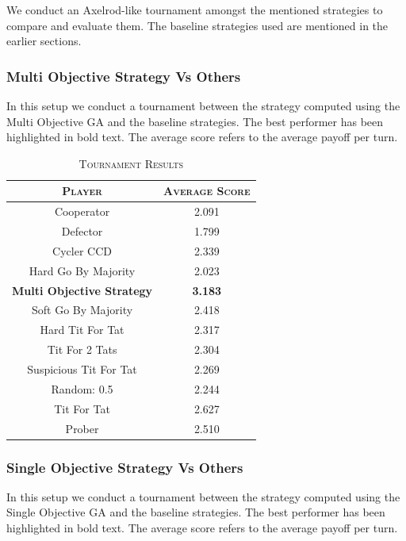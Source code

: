 \documentclass[a4paper]{article}
\begin{document}
	We conduct an Axelrod-like tournament amongst the mentioned strategies to compare and evaluate them. The baseline strategies used are mentioned in the earlier sections.

	\subsubsection{Multi Objective Strategy Vs Others}

	In this setup we conduct a tournament between the strategy computed using the Multi Objective GA and the baseline strategies. The best performer has been highlighted in bold text. The average score refers to the average payoff per turn.

	\begin{table}[H]
	  \begin{center}
	    \begin{tabular}{c|c}
	      \toprule
	      \textsc{Player} & \textsc{Average Score}\\
	      \midrule
			Cooperator & 2.091\\
			Defector & 1.799\\
			Cycler CCD & 2.339\\
			Hard Go By Majority & 2.023\\
			\textbf{Multi Objective Strategy} & \textbf{3.183}\\
			Soft Go By Majority & 2.418\\
			Hard Tit For Tat & 2.317\\
			Tit For 2 Tats & 2.304\\
			Suspicious Tit For Tat & 2.269\\
			Random: 0.5 & 2.244\\
			Tit For Tat & 2.627\\
			Prober & 2.510\\
		  \bottomrule
	    \end{tabular}
	    \caption{\textsc{Tournament Results}}
	  \end{center}
	\end{table}  

	\subsubsection{Single Objective Strategy Vs Others}

In this setup we conduct a tournament between the strategy computed using the Single Objective GA and the baseline strategies. The best performer has been highlighted in bold text. The average score refers to the average payoff per turn.
	
\end{document}
